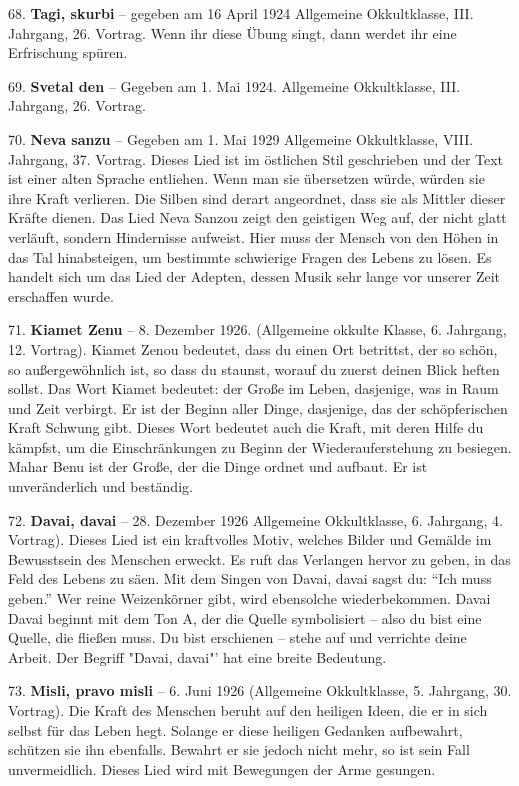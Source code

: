 \documentclass[11pt,a5paper,twoside]{article}
\begin{document}
68. \textbf{Tagi, skurbi} -- gegeben am 16 April 1924 Allgemeine Okkultklasse, III. Jahrgang, 26. Vortrag. Wenn ihr diese Übung singt, dann werdet ihr eine Erfrischung spüren.

69. \textbf{Svetal den} -- Gegeben am 1. Mai 1924. Allgemeine Okkultklasse, III. Jahrgang, 26. Vortrag.

70. \textbf{Neva sanzu} -- Gegeben am 1. Mai 1929 Allgemeine Okkultklasse, VIII. Jahrgang, 37. Vortrag. Dieses Lied ist im östlichen Stil geschrieben und der Text ist einer alten Sprache entliehen. Wenn man sie übersetzen würde, würden sie ihre Kraft verlieren. Die Silben sind derart angeordnet, dass sie als Mittler dieser Kräfte dienen. Das Lied Neva Sanzou zeigt den geistigen Weg auf, der nicht glatt verläuft, sondern Hindernisse aufweist. Hier muss der Mensch von den Höhen in das Tal hinabsteigen, um bestimmte schwierige Fragen des Lebens zu lösen. Es handelt sich um das Lied der Adepten, dessen Musik sehr lange vor unserer Zeit erschaffen wurde.

71. \textbf{Kiamet Zenu} -- 8. Dezember 1926. (Allgemeine okkulte Klasse, 6. Jahrgang, 12. Vortrag). Kiamet Zenou bedeutet, dass du einen Ort betrittst, der so schön, so außergewöhnlich ist, so dass du staunst, worauf du zuerst deinen Blick heften sollst. Das Wort Kiamet bedeutet: der Große im Leben, dasjenige, was in Raum und Zeit verbirgt. Er ist der Beginn aller Dinge, dasjenige, das der schöpferischen Kraft Schwung gibt. Dieses Wort bedeutet auch die Kraft, mit deren Hilfe du kämpfst, um die Einschränkungen zu Beginn der Wiederauferstehung zu besiegen. Mahar Benu ist der Große, der die Dinge ordnet und aufbaut. Er ist unveränderlich und beständig.

72. \textbf{Davai, davai} -- 28. Dezember 1926 Allgemeine Okkultklasse, 6. Jahrgang, 4. Vortrag). Dieses Lied ist ein kraftvolles Motiv, welches Bilder und Gemälde im Bewusstsein des Menschen erweckt. Es ruft das Verlangen hervor zu geben, in das Feld des Lebens zu säen. Mit dem Singen von Davai, davai sagst du: "`Ich muss geben."' Wer reine Weizenkörner gibt, wird ebensolche wiederbekommen. Davai Davai beginnt mit dem Ton A, der die Quelle symbolisiert -- also du bist eine Quelle, die fließen muss. Du bist erschienen -- stehe auf und verrichte deine Arbeit. Der Begriff "Davai, davai"' hat eine breite Bedeutung. 

73. \textbf{Misli, pravo misli} -- 6. Juni 1926 (Allgemeine Okkultklasse, 5. Jahrgang,
30. Vortrag). Die Kraft des Menschen beruht auf den heiligen Ideen, die er in sich selbst für das Leben hegt. Solange er diese heiligen Gedanken aufbewahrt, schützen sie ihn ebenfalls. Bewahrt er sie jedoch nicht mehr, so ist sein Fall unvermeidlich. Dieses Lied wird mit Bewegungen der Arme gesungen.
\end{document}
